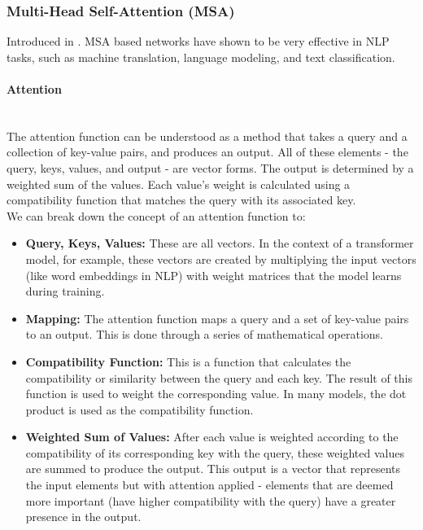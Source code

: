 \subsubsection{Multi-Head Self-Attention (MSA)}
Introduced in \cite{vaswani2017}. MSA based networks have shown to be very effective in NLP tasks, such as machine translation, language modeling, and text classification.

\paragraph{Attention}\mbox{}\\
The attention function can be understood as a method that takes a query and a collection of key-value pairs, and produces an output. All of these elements - the query, keys, values, and output - are vector forms. The output is determined by a weighted sum of the values. Each value's weight is calculated using a compatibility function that matches the query with its associated key.\\

We can break down the concept of an attention function to:
\begin{itemize}
    \item \textbf{Query, Keys, Values:} These are all vectors. In the context of a transformer model, for example, these vectors are created by multiplying the input vectors (like word embeddings in NLP) with weight matrices that the model learns during training.
    \item \textbf{Mapping:} The attention function maps a query and a set of key-value pairs to an output. This is done through a series of mathematical operations.
    \item \textbf{Compatibility Function:} This is a function that calculates the compatibility or similarity between the query and each key. The result of this function is used to weight the corresponding value. In many models, the dot product is used as the compatibility function.
    \item \textbf{Weighted Sum of Values:} After each value is weighted according to the compatibility of its corresponding key with the query, these weighted values are summed to produce the output. This output is a vector that represents the input elements but with attention applied - elements that are deemed more important (have higher compatibility with the query) have a greater presence in the output.
\end{itemize}

